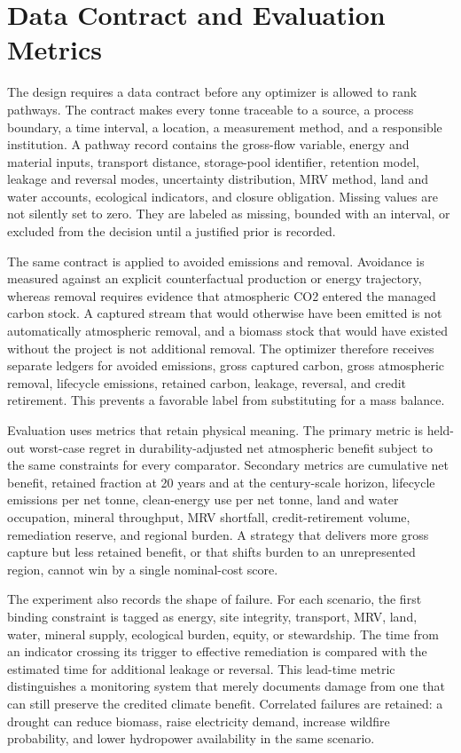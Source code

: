 \documentclass[conference]{IEEEtran}
\begin{document}
\section{Data Contract and Evaluation Metrics}
The design requires a data contract before any optimizer is allowed to rank pathways. The contract makes every tonne traceable to a source, a process boundary, a time interval, a location, a measurement method, and a responsible institution. A pathway record contains the gross-flow variable, energy and material inputs, transport distance, storage-pool identifier, retention model, leakage and reversal modes, uncertainty distribution, MRV method, land and water accounts, ecological indicators, and closure obligation. Missing values are not silently set to zero. They are labeled as missing, bounded with an interval, or excluded from the decision until a justified prior is recorded.

The same contract is applied to avoided emissions and removal. Avoidance is measured against an explicit counterfactual production or energy trajectory, whereas removal requires evidence that atmospheric CO2 entered the managed carbon stock. A captured stream that would otherwise have been emitted is not automatically atmospheric removal, and a biomass stock that would have existed without the project is not additional removal. The optimizer therefore receives separate ledgers for avoided emissions, gross captured carbon, gross atmospheric removal, lifecycle emissions, retained carbon, leakage, reversal, and credit retirement. This prevents a favorable label from substituting for a mass balance.

Evaluation uses metrics that retain physical meaning. The primary metric is held-out worst-case regret in durability-adjusted net atmospheric benefit subject to the same constraints for every comparator. Secondary metrics are cumulative net benefit, retained fraction at 20 years and at the century-scale horizon, lifecycle emissions per net tonne, clean-energy use per net tonne, land and water occupation, mineral throughput, MRV shortfall, credit-retirement volume, remediation reserve, and regional burden. A strategy that delivers more gross capture but less retained benefit, or that shifts burden to an unrepresented region, cannot win by a single nominal-cost score.

The experiment also records the shape of failure. For each scenario, the first binding constraint is tagged as energy, site integrity, transport, MRV, land, water, mineral supply, ecological burden, equity, or stewardship. The time from an indicator crossing its trigger to effective remediation is compared with the estimated time for additional leakage or reversal. This lead-time metric distinguishes a monitoring system that merely documents damage from one that can still preserve the credited climate benefit. Correlated failures are retained: a drought can reduce biomass, raise electricity demand, increase wildfire probability, and lower hydropower availability in the same scenario.
\end{document}
